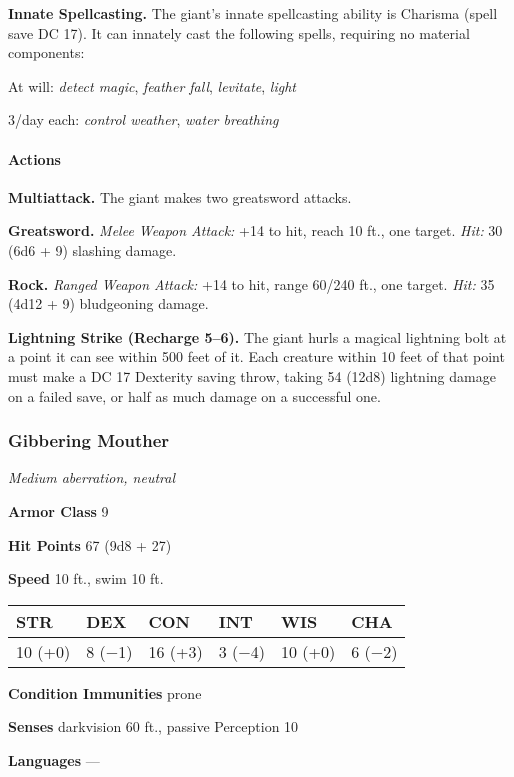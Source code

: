 \documentclass[
]{article}
\begin{document}
\textbf{Innate Spellcasting.} The giant's innate spellcasting ability is
Charisma (spell save DC 17). It can innately cast the following spells,
requiring no material components:

At will: \emph{detect magic}, \emph{feather fall}, \emph{levitate},
\emph{light}

3/day each: \emph{control weather}, \emph{water breathing}

\hypertarget{actions-11}{%
\paragraph{Actions}\label{actions-11}}

\textbf{Multiattack.} The giant makes two greatsword attacks.

\textbf{Greatsword.} \emph{Melee Weapon Attack:} +14 to hit, reach 10
ft., one target. \emph{Hit:} 30 (6d6 + 9) slashing damage.

\textbf{Rock.} \emph{Ranged Weapon Attack:} +14 to hit, range 60/240
ft., one target. \emph{Hit:} 35 (4d12 + 9) bludgeoning damage.

\textbf{Lightning Strike (Recharge 5--6).} The giant hurls a magical
lightning bolt at a point it can see within 500 feet of it. Each
creature within 10 feet of that point must make a DC 17 Dexterity saving
throw, taking 54 (12d8) lightning damage on a failed save, or half as
much damage on a successful one.

\hypertarget{gibbering-mouther}{%
\subsubsection{Gibbering Mouther}\label{gibbering-mouther}}

\emph{Medium aberration, neutral}

\textbf{Armor Class} 9

\textbf{Hit Points} 67 (9d8 + 27)

\textbf{Speed} 10 ft., swim 10 ft.

\begin{longtable}[]{@{}llllll@{}}
\toprule
STR & DEX & CON & INT & WIS & CHA\tabularnewline
\midrule
\endhead
10 (+0) & 8 (−1) & 16 (+3) & 3 (−4) & 10 (+0) & 6 (−2)\tabularnewline
\bottomrule
\end{longtable}

\textbf{Condition Immunities} prone

\textbf{Senses} darkvision 60 ft., passive Perception 10

\textbf{Languages} ---
\end{document}
